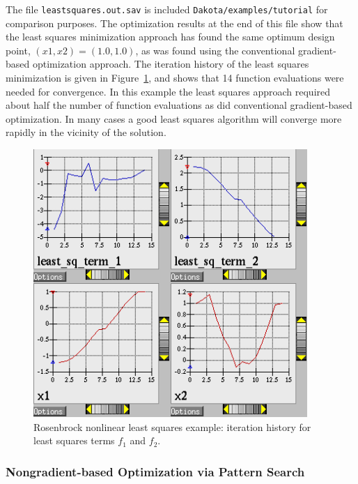 The file \texttt{leastsquares.out.sav} is included
\texttt{Dakota/examples/tutorial} for comparison purposes. The
optimization results at the end of this file show that the least
squares minimization approach has found the same optimum design point,
$(x1,x2) = (1.0,1.0)$, as was found using the conventional
gradient-based optimization approach. The iteration history of the
least squares minimization is given in
Figure~\ref{tutorial:rosenbrock_nls_graphics}, and shows that 14
function evaluations were needed for convergence. In this example the
least squares approach required about half the number of function
evaluations as did conventional gradient-based optimization.
In many cases a good least squares algorithm will converge more rapidly
in the vicinity of the solution.

\begin{figure}[ht!]
  \centering
  \includegraphics[height=4in]{images/nonlin_paramest_hist}
  \caption{Rosenbrock nonlinear least squares example: iteration
    history for least squares terms $f_1$ and $f_2$.}
  \label{tutorial:rosenbrock_nls_graphics}
\end{figure}

\subsubsection{Nongradient-based Optimization via Pattern Search}\label{tutorial:example:optimization:nongradient1}

